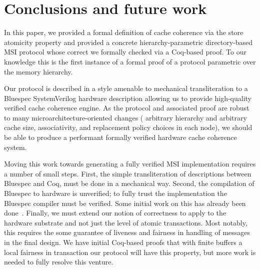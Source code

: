 \section{Conclusions and future work}

In this paper, we provided a formal definition of cache coherence via the store
atomicity property and provided a concrete hierarchy-parametric directory-based
MSI protocol whose correct we formally checked via a Coq-based proof. To our
knowledge this is the first instance of a formal proof of a protocol parametric
over the memory hierarchy.

Our protocol is described in a style amenable to mechanical transliteration to a
Bluespec SystemVerilog hardware description allowing us to provide high-quality
verified cache coherence engine. As the protocol and associated proof are robust
to many microarchitecture-oriented changes (\eg{} arbitrary hierarchy and
arbitrary cache size, associativity, and replacement policy choices in each
node), we should be able to produce a performant formally verified hardware
cache coherence system.

Moving this work towards generating a fully verified MSI implementation requires
a number of small steps. First, the simple transliteration of descriptions
between Bluespec and Coq, must be done in a mechanical way. Second, the
compilation of Bluespec to hardware is unverified; to fully trust the
implementation the Bluespec compiler must be verified. Some initial work on this
has already been done~\cite{TDBLP:conf/cav/BraibantC13}. Finally, we must extend
our notion of correctness to apply to the hardware substrate and not just the
level of atomic transactions. Most notably, this requires the some guarantee of
liveness and fairness in handling of messages in the final design. We have
initial Coq-based proofs that with finite buffers a local fairness in
transaction our protocol will have this property, but more work is needed to
fully resolve this venture. 






